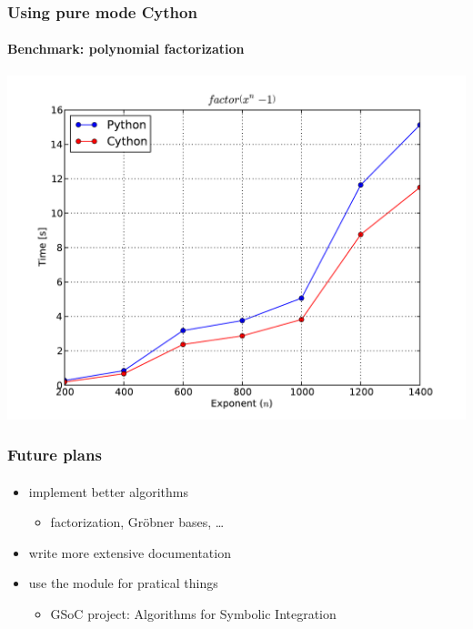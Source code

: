 \documentclass{beamer}
\begin{document}
\begin{frame}
    \frametitle{Using pure mode Cython}
    \framesubtitle{Benchmark: polynomial factorization}

    \begin{center}
        \includegraphics[scale=0.45]{images/cython-factor.pdf}
    \end{center}
\end{frame}

\begin{frame}
    \frametitle{Future plans}
    \framesubtitle{}

    \begin{itemize}
        \item implement better algorithms
            \begin{itemize}
                \item factorization, Gr\"{o}bner bases, \ldots
            \end{itemize}
        \item write more extensive documentation
        \item use the module for pratical things
            \begin{itemize}
                \item GSoC project: Algorithms for Symbolic Integration
            \end{itemize}
    \end{itemize}
\end{frame}
\end{document}
